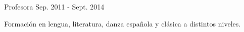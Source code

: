 

\begin{cventries}

  \cventry
    {Profesora} %
    {} %
    {} %
    {Sep. 2011 - Sept. 2014} %
    {
      \begin{cvitems} %
        \item {Formación en lengua, literatura, danza española y clásica a distintos niveles.}
      \end{cvitems}
    }

\end{cventries}
